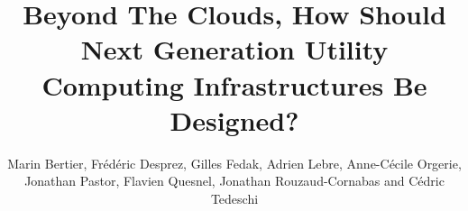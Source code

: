 \documentclass[graybox]{svmult}
\begin{document}
\title*{Beyond The Clouds, How Should Next Generation Utility Computing Infrastructures Be Designed?}
\author{Marin Bertier, Frédéric Desprez, Gilles Fedak, Adrien Lebre, Anne-Cécile Orgerie, Jonathan Pastor, Flavien Quesnel, Jonathan Rouzaud-Cornabas and Cédric Tedeschi}
%
%
\maketitle
\end{document}
